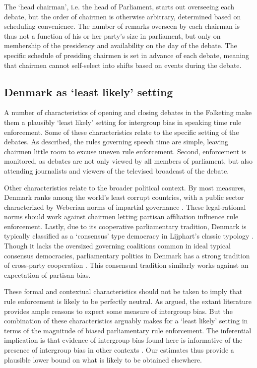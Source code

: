 \documentclass[12pt,a4paper]{article}
\begin{document}
The `head chairman', i.e. the head of Parliament, starts out overseeing each debate, but the order of chairmen is otherwise arbitrary, determined based on scheduling convenience. The number of remarks overseen by each chairman is thus not a function of his or her party's size in parliament, but only on membership of the presidency and availability on the day of the debate. The specific schedule of presiding chairmen is set in advance of each debate, meaning that chairmen cannot self-select into shifts based on events during the debate.

\subsection{Denmark as `least likely' setting}

A number of characteristics of opening and closing debates in the Folketing make them a plausibly `least likely' setting for intergroup bias in speaking time rule enforcement. Some of these characteristics relate to the specific setting of the debates. As described, the rules governing speech time are simple, leaving chairmen little room to excuse uneven rule enforcement. Second, enforcement is monitored, as debates are not only viewed by all members of parliament, but also attending journalists and viewers of the televised broadcast of the debate.

Other characteristics relate to the broader political context. By most measures, Denmark ranks among the world's least corrupt countries, with a public sector characterized by Weberian norms of impartial governance \citep{Treisman2000}. These legal-rational norms should work against chairmen letting partisan affiliation influence rule enforcement. Lastly, due to its cooperative parliamentary tradition, Denmark is typically classified as a `consensus' type democracy in Lijphart's classic typology \citep{Lijphart1999,Esaiasson2000}. Though it lacks the oversized governing coalitions common in ideal typical consensus democracies, parliamentary politics in Denmark has a strong tradition of cross-party cooperation \cite{Green-Pedersen2005}. This consensual tradition similarly works against an expectation of partisan bias.

These formal and contextual characteristics should not be taken to imply that rule enforcement is likely to be perfectly neutral. As argued, the extant literature provides ample reasons to expect some measure of intergroup bias. But the combination of these characteristics arguably makes for a `least likely' setting in terms of the magnitude of biased parliamentary rule enforcement. The inferential implication is that evidence of intergroup bias found here is informative of the presence of intergroup bias in other contexts \citep{Levy2008}. Our estimates thus provide a plausible lower bound on what is likely to be obtained elsewhere.
\end{document}

